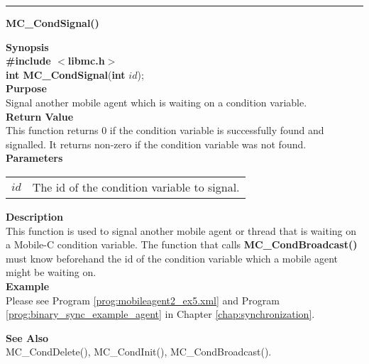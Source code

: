 \noindent
\vspace{5pt}
\rule{6.5in}{0.015in}
\noindent
{}
{\LARGE \bf MC\_CondSignal()}\\

\noindent
{\bf Synopsis}\\
{\bf \#include $<$libmc.h$>$}\\
{\bf int MC\_CondSignal}({\bf int} $id$);\\

\noindent
{\bf Purpose}\\
Signal another mobile agent which is waiting on a condition variable.\\

\noindent
{\bf Return Value}\\
This function returns 0 if the condition variable is successfully found and 
signalled.
It returns non-zero if the condition variable was not found.\\

\noindent
{\bf Parameters}
\vspace{-0.1in}
\begin{description}
\item
\begin{tabular}{p{10 mm}p{145 mm}}
$id$ & The id of the condition variable to signal.
\end{tabular}
\end{description}

\noindent
{\bf Description}\\
This function is used to signal another mobile agent or thread that is 
waiting on a Mobile-C condition variable. 
The function that calls {\bf MC\_CondBroadcast()} must know beforehand the 
id of the condition variable which a mobile agent might be waiting on.\\

\noindent
{\bf Example}\\
Please see Program \vref{prog:mobileagent2_ex5.xml} and 
Program \vref{prog:binary_sync_example_agent} in Chapter 
\ref{chap:synchronization}.
\noindent

\noindent
{\bf See Also}\\
MC\_CondDelete(), MC\_CondInit(), MC\_CondBroadcast().\\

